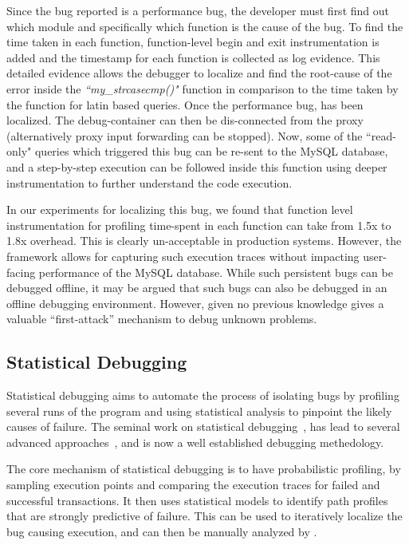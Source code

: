 Since the bug reported is a performance bug, the developer must first find out which module and specifically which function is the cause of the bug.
To find the time taken in each function, function-level begin and exit instrumentation is added and the timestamp for each function is collected as log evidence.
This detailed evidence allows the debugger to localize and find the root-cause of the error inside the \emph{``my\_strcasecmp()"} function in comparison to the time taken by the function for latin based queries.
Once the performance bug, has been localized.
The debug-container can then be dis-connected from the proxy (alternatively proxy input forwarding can be stopped).
Now, some of the ``read-only" queries which triggered this bug can be re-sent to the MySQL database, and a step-by-step execution can be followed inside this function using deeper instrumentation to further understand the code execution.

In our experiments for localizing this bug, we found that function level instrumentation for profiling time-spent in each function can take from 1.5x to 1.8x overhead.
This is clearly un-acceptable in production systems.
However, the \parikshan framework allows for capturing such execution traces without impacting user-facing performance of the MySQL database.
While such persistent bugs can be debugged offline, it may be argued that such bugs can also be debugged in an offline debugging environment.
However, given no previous knowledge \parikshan gives a valuable ``first-attack'' mechanism to debug unknown problems.

\subsection{Statistical Debugging}
\label{sec:activeStatisticalDebugging}

Statistical debugging aims to automate the process of isolating bugs by profiling several runs of the program and using statistical analysis to pinpoint the likely causes of failure. 
The seminal work on statistical debugging~\cite{statisticalDebugging}, has lead to several advanced approaches~\cite{holmes,adaptive,statisticalPerformance}, and is now a well established debugging methedology. 

The core mechanism of statistical debugging is to have probabilistic profiling, by sampling execution points and comparing the execution traces for failed and successful transactions.
It then uses statistical models to identify path profiles that are strongly predictive of failure. 
This can be used to iteratively localize the bug causing execution, and can then be manually analyzed by \parikshan.

